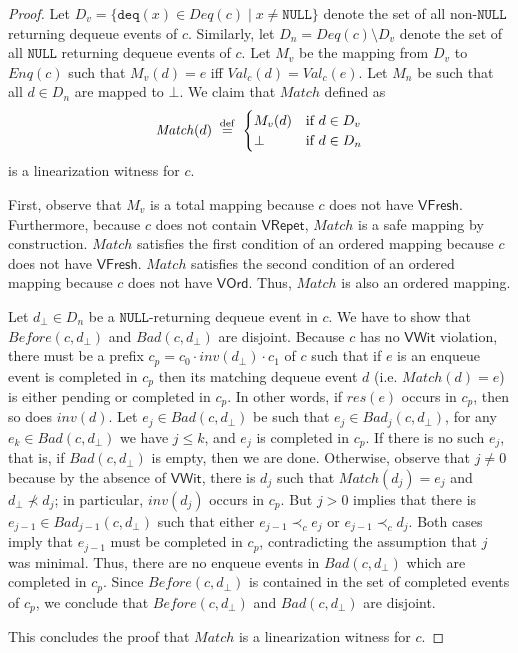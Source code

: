 \documentclass{LMCS}
\newcommand{\defeq}{\;\stackrel{\rm def}{=}\;}
\newcommand{\NULL}{\ensuremath{\mathtt{NULL}}}
\newcommand{\deq}{\ensuremath{\mathtt{deq}}}
\newcommand{\Match}{\ensuremath{\mathit{Match}}}
\newcommand{\Deq}[1]{\ensuremath{\mathit{Deq}({#1})}}
\newcommand{\Enq}[1]{\ensuremath{\mathit{Enq}({#1})}}
\newcommand{\Before}[2]{\ensuremath{\mathit{Before}({#1},{#2})}}
\newcommand{\Val}[2]{\ensuremath{\mathit{Val}_{#1}({#2})}}
\newcommand{\Bad}[2]{\ensuremath{\mathit{Bad}(#1,#2)}}
\newcommand{\Badx}[3]{\ensuremath{\mathit{Bad}_{#3}(#1,#2)}}
\newcommand{\dhat}{\ensuremath{d_{\bot}}}
\newcommand{\VFresh}{\ensuremath{\mathsf{VFresh}}}
\newcommand{\VRepet}{\ensuremath{\mathsf{VRepet}}}
\newcommand{\VOrd}{\ensuremath{\mathsf{VOrd}}}
\newcommand{\VWit}{\ensuremath{\mathsf{VWit}}}
\begin{document}
\begin{proof}
Let $D_v=\{\deq(x)\in {\Deq c} \mid x\neq\NULL\}$ denote the set of all {non-\NULL} returning dequeue events of $c$.
Similarly, let $D_n=\Deq{c}\setminus D_v$ denote the set of all {\NULL} returning dequeue events of $c$.
Let $M_v$ be the mapping from $D_v$ to $\Enq c$ such that $M_v(d)=e$ iff $\Val c d = \Val c e$. 
Let $M_n$ be such that all $d\in D_n$ are mapped to $\bot$.
We claim that $\Match$ defined as 
\[
\Match(d) \defeq 
	\begin{cases}
		M_v(d) & \text{if } d\in D_v \\
		\bot & \text{if } d\in D_n
	\end{cases}
\]
is a linearization witness for $c$.

First, observe that $M_v$ is a total mapping because $c$ does not have {\VFresh}.
Furthermore, because $c$ does not contain {\VRepet}, $\Match$ is a safe mapping by construction.
$\Match$ satisfies the first condition of an ordered mapping because $c$ does not have {\VFresh}.
$\Match$ satisfies the second condition of an ordered mapping because $c$ does not have {\VOrd}.
Thus, $\Match$ is also an ordered mapping.

Let $\dhat\in D_n$ be a {\NULL}-returning dequeue event in $c$.
We have to show that $\Before c {\dhat}$ and $\Bad c {\dhat}$ are disjoint.
Because $c$ has no {\VWit} violation, there must be a prefix $c_p=c_0\cdot inv(\dhat)\cdot c_1$ of $c$ such that if $e$ is an enqueue event is completed in $c_p$ then its matching dequeue event $d$ (i.e. $\Match(d)=e$) is either pending or completed in $c_p$.
In other words, if $res(e)$ occurs in $c_p$, then so does $inv(d)$.
Let $e_j\in \Bad c {\dhat}$ be such that $e_j\in \Badx c {\dhat} j$, for any $e_k\in \Bad c {\dhat}$ we have $j\leq k$, and $e_j$ is completed in $c_p$.
If there is no such $e_j$, that is, if $\Bad c {\dhat}$ is empty, then we are done.
Otherwise, observe that $j\neq 0$ because by the absence of {\VWit}, there is $d_j$ such that $\Match(d_j)=e_j$ and $\dhat\not\prec d_j$; in particular, $inv(d_j)$ occurs in $c_p$.
But $j>0$ implies that there is $e_{j-1}\in \Badx c {\dhat} {j-1}$ such that either $e_{j-1}\prec_c e_j$ or $e_{j-1}\prec_c d_j$.
Both cases imply that $e_{j-1}$ must be completed in $c_p$, contradicting the assumption that $j$ was minimal.
Thus, there are no enqueue events in $\Bad c {\dhat}$ which are completed in $c_p$.
Since $\Before c {\dhat}$ is contained in the set of completed events of $c_p$, we conclude that $\Before c {\dhat}$ and $\Bad c {\dhat}$ are disjoint.

This concludes the proof that $\Match$ is a linearization witness for $c$.
\end{proof}
\end{document}
